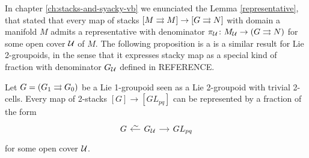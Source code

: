 %
%

In chapter \ref{ch:stacks-and-syacky-vb} we enunciated the Lemma \ref{representative}, that stated that every map of stacks $[M\rightrightarrows M]\to [G\rightrightarrows N]$ with domain a manifold $M$ admits a representative with denominator \( \pi_{\mathcal{U}}\colon M_{\mathcal{U}} \to (G\rightrightarrows N) \) for some open cover $\mathcal{U}$ of $M$.
The following proposition is a is a similar result for Lie 2-groupoids, in the sense that it expresses stacky map as a special kind of fraction with denominator $G_{\mathcal{U}}$ defined in REFERENCE.

\begin{prop}
Let $G = (G_1\rightrightarrows G_0)$ be a Lie 1-groupoid seen as a Lie 2-groupoid with trivial 2-cells.
Every map of 2-stacks $[G]\to [GL_{pq}]$ can be represented by a fraction of the form
\begin{equation}
\begin{tikzcd}[sep = small]
  G & G_\U \ar{l}[pos=.45, above]{\sim} \ar{r} & GL_{pq}
\end{tikzcd}
\end{equation}
for some open cover $\mathcal{U}$.
\end{prop}

